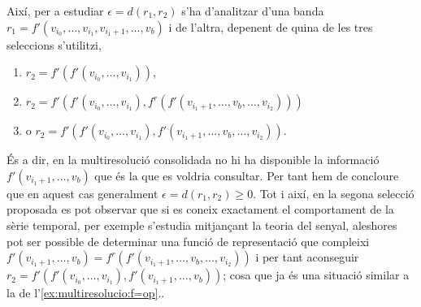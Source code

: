    Així, per a estudiar $\epsilon=d(r_1,r_2)$ s'ha d'analitzar d'una
   banda $r_1=f'(v_{i_0},\dotsc,v_{i_1},v_{i_1+1},\dotsc,v_{b})$ i de l'altra, depenent de quina de les
   tres seleccions s'utilitzi,
   \begin{enumerate}
   \item $r_2=f'(f'(v_{i_0},\dotsc,v_{i_1}))$, 

   \item
     $r_2=f'(f'(v_{i_0},\dotsc,v_{i_1}),f^r(f'(v_{i_1+1},\dotsc,v_{b},\dotsc,v_{i_2})))$
     \item o $r_2=f'(f'(v_{i_0},\dotsc,v_{i_1}),f'(v_{i_1+1},\dotsc,v_{b},\dotsc,v_{i_2}))$.
\end{enumerate}

És a dir, en la multiresolució consolidada no hi ha disponible la
informació $f'(v_{i_1+1},\dotsc,v_{b})$ que és la que es voldria
consultar.  Per tant hem de concloure que en aquest cas generalment
$\epsilon=d(r_1,r_2)\geq 0$. Tot i així, en la segona selecció
proposada es pot observar que si es coneix exactament el comportament
de la sèrie temporal, per exemple s'estudia mitjançant la teoria del
senyal, aleshores pot ser possible de determinar una funció de
representació que compleixi $ f'(v_{i_1+1},\dotsc,v_{b}) =
f^r(f'(v_{i_1+1},\dotsc,v_{b},\dotsc,v_{i_2}))$ i per tant aconseguir
$r_2=f'(f'(v_{i_0},\dotsc,v_{i_1}), f'(v_{i_1+1},\dotsc,v_{b}) )$;
cosa que ja és una situació similar a la de
l'\autoref{ex:multiresolucio:f=op}..







